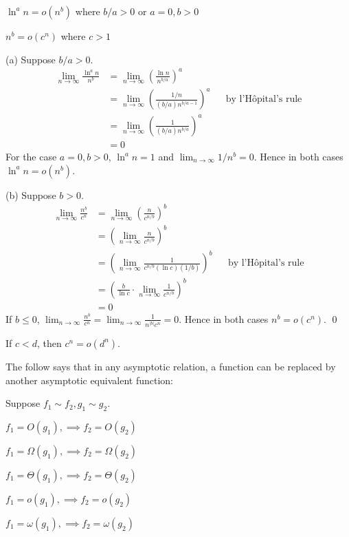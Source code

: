 \begin{prop}
  \mbox{}
  \begin{myenum}
  \item $\ln^a n = o(n^b)$ where $b/a > 0$ or $a = 0, b > 0$
  \item $n^b = o(c^n)$ where $c > 1$
  \end{myenum}
\end{prop}
\proof
(a)
Suppose $b/a > 0$.
\begin{align*}
  \lim_{n \rightarrow \infty} \frac{\ln^a n}{n^b}
  &= \lim_{n \rightarrow \infty} \left( \frac{\ln n}{n^{b/a}} \right)^a\\
  &= \lim_{n \rightarrow \infty} \left( \frac{1/n}{(b/a)n^{b/a - 1}} \right)^a & & \text{by l'H\^opital's rule}\\
  &= \lim_{n \rightarrow \infty} \left( \frac{1}{(b/a)n^{b/a}} \right)^a\\
  &= 0
\end{align*}
For the case $a = 0, b > 0$, $\ln^a n = 1$ and
$\displaystyle \lim_{n \rightarrow \infty} 1/n^b = 0$.
Hence in both cases $\ln^a n = o(n^b)$.

(b)
Suppose $b > 0$.
\begin{align*}
  \lim_{n \rightarrow \infty} \frac{n^b}{c^n}
  &= \lim_{n \rightarrow \infty} \left( \frac{n}{c^{n/b}} \right)^b\\
  &= \left( \lim_{n \rightarrow \infty} \frac{n}{c^{n/b}} \right)^b\\
  &= \left( \lim_{n \rightarrow \infty} \frac{1}{c^{n/b}(\ln c)(1/b)} \right)^b & & \text{by l'H\^opital's rule}\\
  &= \left( \frac{b}{\ln c} \cdot \lim_{n \rightarrow \infty} \frac{1}{c^{n/b}} \right)^b\\
  &= 0
\end{align*}
If $b \leq 0$,
$\displaystyle\lim_{n \rightarrow \infty} \frac{n^b}{c^n} = \lim_{n \rightarrow \infty} \frac{1}{n^{|b|}c^n} = 0$.
Hence in both cases $n^b = o(c^n)$.
\qed

\begin{prop}
  If $c < d$, then $c^n = o(d^n)$.
\end{prop}

The follow says that in any asymptotic relation, a function can be
replaced by another asymptotic equivalent function:

\begin{prop}
  Suppose $f_1 \sim f_2, g_1 \sim g_2$.
  \begin{myenum}
  \item $f_1 = O(g_1),  \implies f_2 = O(g_2)$
  \item $f_1 = \Omega(g_1),  \implies f_2 = \Omega(g_2)$
  \item $f_1 = \Theta(g_1),  \implies f_2 = \Theta(g_2)$
  \item $f_1 = o(g_1),  \implies f_2 = o(g_2)$
  \item $f_1 = \omega(g_1),  \implies f_2 = \omega(g_2)$
  \end{myenum}
\end{prop}

%
